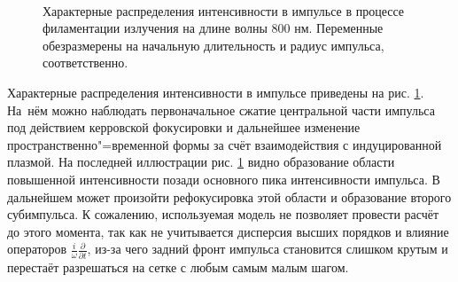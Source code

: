 \begin{figure}[H]
    \begin{center}
        \begin{minipage}{\minipagewidththree}
        \end{minipage}
        \hfill
        \begin{minipage}{\minipagewidththree}
        \end{minipage}
        \hfill
        \begin{minipage}{\minipagewidththree}
        \end{minipage}
        \\[1ex]
        \caption{Характерные распределения интенсивности в импульсе в процессе филаментации излучения на длине волны 800 нм.
                 Переменные обезразмерены на начальную длительность и радиус импульса, соответственно.}
        \label{fig:PulsesRTBW}
    \end{center}
\end{figure}


Характерные распределения интенсивности в импульсе приведены на рис. \ref{fig:PulsesRTBW}. На~нём можно наблюдать первоначальное сжатие центральной части импульса
под действием керровской фокусировки и дальнейшее изменение пространственно"=временной формы за счёт взаимодействия с индуцированной плазмой.
На последней иллюстрации рис. \ref{fig:PulsesRTBW} видно образование области повышенной интенсивности позади основного пика интенсивности импульса.
В дальнейшем может произойти рефокусировка этой области и образование второго субимпульса.
К сожалению, используемая модель не позволяет провести расчёт до этого момента, так как не учитывается дисперсия высших порядков
и влияние операторов $\frac{i}{\omega}\frac{\partial }{\partial t}$, из-за чего задний фронт импульса становится слишком крутым
и перестаёт разрешаться на сетке с любым самым малым шагом.


